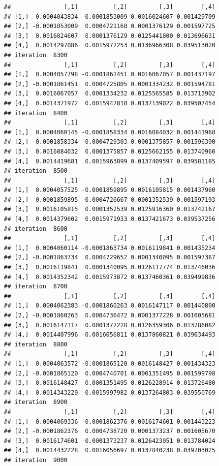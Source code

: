 \documentclass[
]{article}
\begin{document}
\begin{verbatim}
##               [,1]          [,2]         [,3]        [,4]
## [1,]  0.0004043834 -0.0001853009 0.0016024607 0.001429709
## [2,] -0.0001853009  0.0004721168 0.0001376129 0.001597725
## [3,]  0.0016024607  0.0001376129 0.0125441800 0.013696631
## [4,]  0.0014297086  0.0015977253 0.0136966308 0.039513020
## iteration  8300 
##               [,1]          [,2]         [,3]        [,4]
## [1,]  0.0004057798 -0.0001861451 0.0016067057 0.001437197
## [2,] -0.0001861451  0.0004725805 0.0001334232 0.001594781
## [3,]  0.0016067057  0.0001334232 0.0125565585 0.013713902
## [4,]  0.0014371972  0.0015947810 0.0137139022 0.039507454
## iteration  8400 
##               [,1]          [,2]         [,3]        [,4]
## [1,]  0.0004060145 -0.0001858334 0.0016084032 0.001441968
## [2,] -0.0001858334  0.0004729303 0.0001375857 0.001596390
## [3,]  0.0016084032  0.0001375857 0.0125662155 0.013740960
## [4,]  0.0014419681  0.0015963899 0.0137409597 0.039581185
## iteration  8500 
##               [,1]          [,2]         [,3]        [,4]
## [1,]  0.0004057525 -0.0001859895 0.0016105815 0.001437960
## [2,] -0.0001859895  0.0004726667 0.0001352539 0.001597193
## [3,]  0.0016105815  0.0001352539 0.0125916360 0.013742167
## [4,]  0.0014379602  0.0015971933 0.0137421673 0.039537256
## iteration  8600 
##               [,1]          [,2]         [,3]        [,4]
## [1,]  0.0004060114 -0.0001863734 0.0016119841 0.001435234
## [2,] -0.0001863734  0.0004729652 0.0001340095 0.001597387
## [3,]  0.0016119841  0.0001340095 0.0126117774 0.013746036
## [4,]  0.0014352342  0.0015973872 0.0137460361 0.039499836
## iteration  8700 
##               [,1]          [,2]         [,3]        [,4]
## [1,]  0.0004062383 -0.0001860263 0.0016147117 0.001440800
## [2,] -0.0001860263  0.0004736472 0.0001377228 0.001605681
## [3,]  0.0016147117  0.0001377228 0.0126359306 0.013786082
## [4,]  0.0014407996  0.0016056811 0.0137860821 0.039634493
## iteration  8800 
##               [,1]          [,2]         [,3]        [,4]
## [1,]  0.0004063572 -0.0001865120 0.0016148427 0.001434323
## [2,] -0.0001865120  0.0004740701 0.0001351495 0.001599798
## [3,]  0.0016148427  0.0001351495 0.0126228914 0.013726480
## [4,]  0.0014343229  0.0015997982 0.0137264803 0.039550769
## iteration  8900 
##               [,1]          [,2]         [,3]        [,4]
## [1,]  0.0004069336 -0.0001862376 0.0016174601 0.001443223
## [2,] -0.0001862376  0.0004738720 0.0001373237 0.001605670
## [3,]  0.0016174601  0.0001373237 0.0126423051 0.013784024
## [4,]  0.0014432228  0.0016056697 0.0137840238 0.039703025
## iteration  9000 

\end{verbatim}
\end{document}
